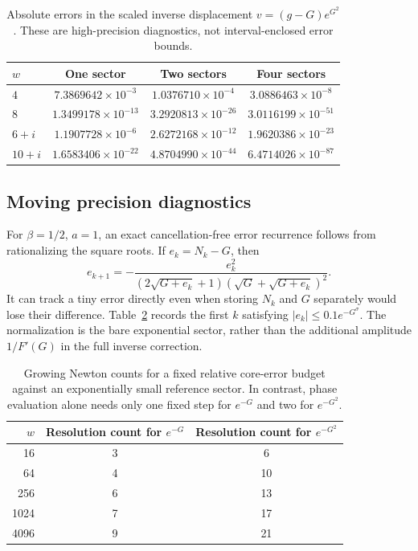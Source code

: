 \documentclass[11pt,a4paper]{article}
\theoremstyle{definition}
\theoremstyle{remark}
\numberwithin{equation}{section}
\begin{document}
\begin{table}[htbp]
\centering\small
\begin{tabular}{@{}lccc@{}}
\toprule
$w$ & One sector & Two sectors & Four sectors\\
\midrule
$4$ & $7.3869642\times10^{-3}$ & $1.0376710\times10^{-4}$ & $3.0886463\times10^{-8}$\\
$8$ & $1.3499178\times10^{-13}$ & $3.2920813\times10^{-26}$ & $3.0116199\times10^{-51}$\\
$6+i$ & $1.1907728\times10^{-6}$ & $2.6272168\times10^{-12}$ & $1.9620386\times10^{-23}$\\
$10+i$ & $1.6583406\times10^{-22}$ & $4.8704990\times10^{-44}$ & $6.4714026\times10^{-87}$\\
\bottomrule
\end{tabular}
\caption{Absolute errors in the scaled inverse displacement $v=(g-G)e^{G^2}$. These are high-precision diagnostics, not interval-enclosed error bounds.}\label{tab:inverse}
\end{table}

\subsection{Moving precision diagnostics}

For $\beta=1/2$, $a=1$, an exact cancellation-free error recurrence follows from rationalizing the square roots. If $e_k=N_k-G$, then
\begin{equation}\label{eq:stableNewtonerror}
 e_{k+1}=-\frac{e_k^2}
 {(2\sqrt{G+e_k}+1)(\sqrt G+\sqrt{G+e_k})^2}.
\end{equation}
It can track a tiny error directly even when storing $N_k$ and $G$ separately would lose their difference. Table~\ref{tab:moving} records the first $k$ satisfying $|e_k|\le0.1e^{-G^\sigma}$. The normalization is the bare exponential sector, rather than the additional amplitude $1/F'(G)$ in the full inverse correction.

\begin{table}[htbp]
\centering
\begin{tabular}{@{}rcc@{}}
\toprule
$w$ & Resolution count for $e^{-G}$ & Resolution count for $e^{-G^2}$\\
\midrule
16 & 3 & 6\\
64 & 4 & 10\\
256 & 6 & 13\\
1024 & 7 & 17\\
4096 & 9 & 21\\
\bottomrule
\end{tabular}
\caption{Growing Newton counts for a fixed relative core-error budget against an exponentially small reference sector. In contrast, phase evaluation alone needs only one fixed step for $e^{-G}$ and two for $e^{-G^2}$.}\label{tab:moving}
\end{table}
\end{document}
